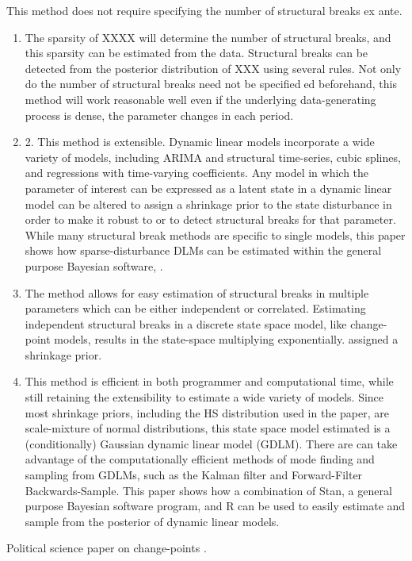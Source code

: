 This method does not require specifying the number of structural breaks ex ante.
\begin{enumerate}
\item The sparsity of XXXX will determine the number of structural breaks, and this sparsity can be estimated from the data.
Structural breaks can be detected from the posterior distribution of XXX using several rules. Not only do
the number of structural breaks need not be specifieded beforehand, this method will work reasonable
well even if the underlying data-generating process is dense, \ie{}the parameter changes in each period.
\item 2. This method is extensible. 
  Dynamic linear models incorporate a wide variety of models, including ARIMA
  and structural time-series, cubic splines, and regressions with time-varying coefficients. Any model in
  which the parameter of interest can be expressed as a latent state in a dynamic linear model can be
  altered to assign a shrinkage prior to the state disturbance in order to make it robust to or to detect
  structural breaks for that parameter. While many structural break methods are specific to single
  models, this paper shows how sparse-disturbance DLMs can be estimated within the general purpose
  Bayesian software, \Stan{}.
\item The method allows for easy estimation of structural breaks in multiple parameters which can be either
independent or correlated. Estimating independent structural breaks in a discrete state space model,
like change-point models, results in the state-space multiplying exponentially.
assigned a shrinkage prior.
\item This method is efficient in both programmer and computational time, while still retaining the extensibility
to estimate a wide variety of models. Since most shrinkage priors, including the HS distribution
used in the paper, are scale-mixture of normal distributions, this state space model estimated is a
(conditionally) Gaussian dynamic linear model (GDLM). There are can take advantage of the computationally
efficient methods of mode finding and sampling from GDLMs, such as the Kalman filter and
Forward-Filter Backwards-Sample. This paper shows how a combination of Stan, a general purpose
Bayesian software program, and R can be used to easily estimate and sample from the posterior of
dynamic linear models.
\end{enumerate}

Political science paper on change-points \parencites{CalderiaZorn1998}{WesternKleykamp2004}{Spirling2007a}{Spirling2007b}{Park2010}{Park2011}{Blackwell2012}.

